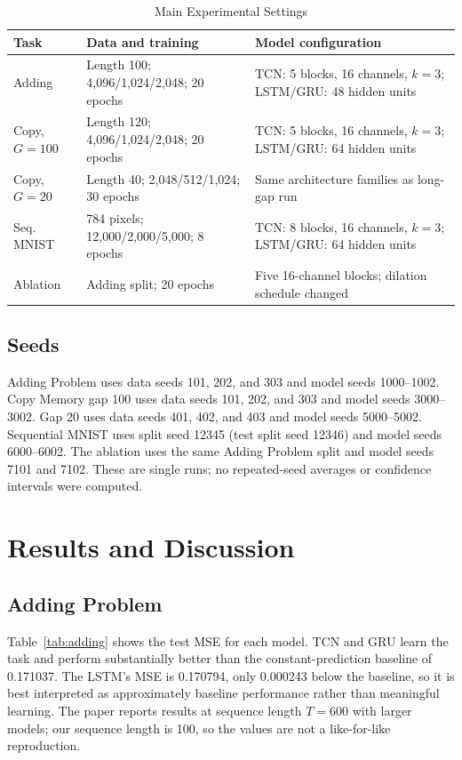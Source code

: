 \documentclass[conference]{IEEEtran}
\begin{document}
\begin{table}[t]
\caption{Main Experimental Settings}
\label{tab:settings}
\centering
\scriptsize
\begin{tabular}{p{}p{}p{}}
\toprule
Task & Data and training & Model configuration\\
\midrule
Adding & Length 100; 4,096/1,024/2,048; 20 epochs & TCN: 5 blocks, 16 channels, $k=3$; LSTM/GRU: 48 hidden units\\
Copy, $G=100$ & Length 120; 4,096/1,024/2,048; 20 epochs & TCN: 5 blocks, 16 channels, $k=3$; LSTM/GRU: 64 hidden units\\
Copy, $G=20$ & Length 40; 2,048/512/1,024; 30 epochs & Same architecture families as long-gap run\\
Seq. MNIST & 784 pixels; 12,000/2,000/5,000; 8 epochs & TCN: 8 blocks, 16 channels, $k=3$; LSTM/GRU: 64 hidden units\\
Ablation & Adding split; 20 epochs & Five 16-channel blocks; dilation schedule changed\\
\bottomrule
\end{tabular}
\end{table}

\subsection{Seeds}
Adding Problem uses data seeds 101, 202, and 303 and model seeds 1000--1002. Copy Memory gap 100 uses data seeds 101, 202, and 303 and model seeds 3000--3002. Gap 20 uses data seeds 401, 402, and 403 and model seeds 5000--5002. Sequential MNIST uses split seed 12345 (test split seed 12346) and model seeds 6000--6002. The ablation uses the same Adding Problem split and model seeds 7101 and 7102. These are single runs; no repeated-seed averages or confidence intervals were computed.

\section{Results and Discussion}
\subsection{Adding Problem}
Table~\ref{tab:adding} shows the test MSE for each model. TCN and GRU learn the task and perform substantially better than the constant-prediction baseline of 0.171037. The LSTM's MSE is 0.170794, only 0.000243 below the baseline, so it is best interpreted as approximately baseline performance rather than meaningful learning. The paper reports results at sequence length $T=600$ with larger models; our sequence length is 100, so the values are not a like-for-like reproduction.
\end{document}
